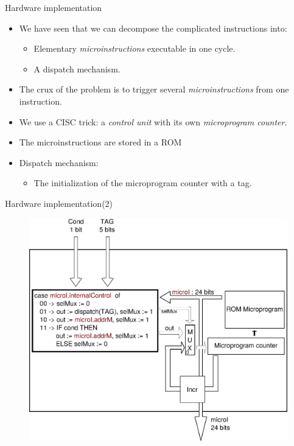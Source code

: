 \documentclass{beamer}
\begin{document}
\begin{frame}{Hardware implementation}
\begin{itemize}
\item We have seen that we can decompose the complicated instructions into:
\begin{itemize}
\item Elementary \emph{microinstructions} executable in one cycle.
\item A dispatch mechanism.
\end{itemize}
\item The crux of the problem is to trigger several \emph{microinstructions} from one
instruction.  
\end{itemize}
\end{frame}

\begin{frame}
\begin{itemize}
\item We use a CISC trick: a \emph{control unit} with its own \emph{microprogram
counter}.
\item The microinstructions are stored in a ROM 
\item Dispatch mechanism:
\begin{itemize}
\item The initialization of the microprogram counter with a tag. 
\end{itemize}
\end{itemize}
\end{frame}

\begin{frame}{Hardware implementation(2)}
\begin{figure}[h]
\center
\includegraphics[scale=0.40]{control.eps}
\end{figure}
\end{frame}
\end{document}
